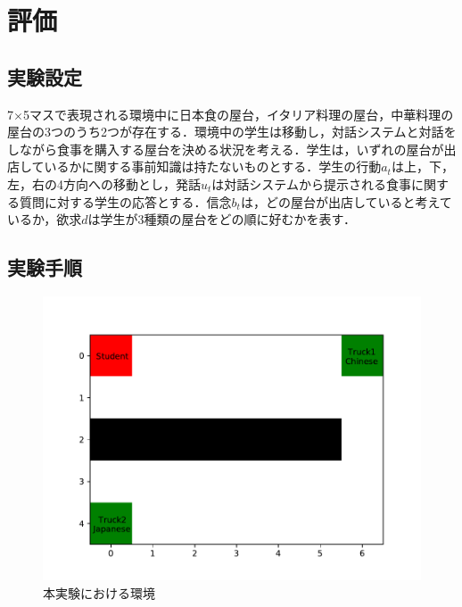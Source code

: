 \chapter{評価}

\section{実験設定}

\par
7$\times$5マスで表現される環境中に日本食の屋台，イタリア料理の屋台，中華料理の屋台の3つのうち2つが存在する．環境中の学生は移動し，対話システムと対話をしながら食事を購入する屋台を決める状況を考える．学生は，いずれの屋台が出店しているかに関する事前知識は持たないものとする．学生の行動$a_t$は上，下，左，右の4方向への移動とし，発話$u_t$は対話システムから提示される食事に関する質問に対する学生の応答とする．信念$b_t$は，どの屋台が出店していると考えているか，欲求$d$は学生が3種類の屋台をどの順に好むかを表す．

\section{実験手順}

\begin{figure}[htbp]
  \begin{center}
    \includegraphics[]{./figure.pdf}
    \caption{本実験における環境}
    \label{fig:ex_env}
  \end{center}
\end{figure}

